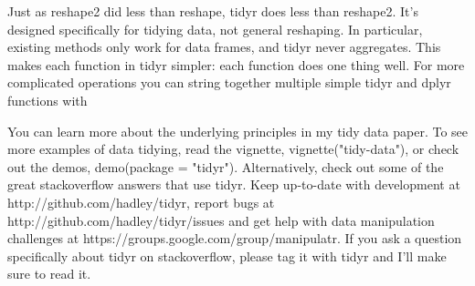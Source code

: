 Just as reshape2 did less than reshape, tidyr does less than reshape2. It’s designed specifically for tidying data, not general reshaping. In particular, existing methods only work for data frames, and tidyr never aggregates. This makes each function in tidyr simpler: each function does one thing well. For more complicated operations you can string together multiple simple tidyr and dplyr functions with %
 
You can learn more about the underlying principles in my tidy data paper. To see more examples of data tidying, read the vignette, vignette("tidy-data"), or check out the demos, demo(package = "tidyr"). Alternatively, check out some of the great stackoverflow answers that use tidyr. Keep up-to-date with development at http://github.com/hadley/tidyr, report bugs at http://github.com/hadley/tidyr/issues and get help with data manipulation challenges at https://groups.google.com/group/manipulatr. If you ask a question specifically about tidyr on stackoverflow, please tag it with tidyr and I’ll make sure to read it.
